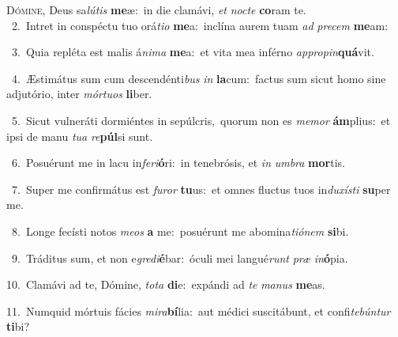 \lettrine{\initial\textcolor{\initialcolor}{D}}{ómine,} Deus sa\-\textit{lú}\-\textit{tis} \textbf{me}\-æ:~\star in die clamávi, \textit{et} \textit{noc}\-\textit{te} \textbf{co}\-ram te.\\
{\numbfont\textcolor{\numbcolor}{~2.}}~Intret in conspéctu tuo orá\-\textit{ti}\-\textit{o} \textbf{me}\-a:~\star inclína aurem tuam \textit{ad} \textit{pre}\-\textit{cem} \textbf{me}\-am:\par
{\numbfont\textcolor{\numbcolor}{~3.}}~Quia repléta est malis á\-\textit{ni}\-\textit{ma} \textbf{me}\-a:~\star et vita mea inférno \textit{ap}\-\textit{pro}\textit{pin}\textbf{quá}vit.\par
{\numbfont\textcolor{\numbcolor}{~4.}}~Æstimátus sum cum descendénti\textit{bus} \textit{in} \textbf{la}\-cum:~\star factus sum sicut homo sine adjutório, inter \textit{mór}\-\textit{tu}\textit{os} \textbf{li}\-ber.\par
{\numbfont\textcolor{\numbcolor}{~5.}}~Sicut vulneráti dormiéntes in sepúlcris,~\dagger quorum non es \textit{me}\-\textit{mor} \textbf{ám}\-plius:~\star et ipsi de manu \textit{tu}\-\textit{a} \textit{re}\-\textbf{púl}si sunt.\par
{\numbfont\textcolor{\numbcolor}{~6.}}~Posuérunt me in lacu in\-\textit{fe}\-\textit{ri}\textbf{ó}ri:~\star in tenebrósis, et \textit{in} \textit{um}\-\textit{bra} \textbf{mor}\-tis.\par
{\numbfont\textcolor{\numbcolor}{~7.}}~Super me confirmátus est \textit{fu}\-\textit{ror} \textbf{tu}\-us:~\star et omnes fluctus tuos in\-\textit{du}\-\textit{xís}\textit{ti} \textbf{su}\-per me.\par
{\numbfont\textcolor{\numbcolor}{~8.}}~Longe fecísti notos \textit{me}\-\textit{os} \textbf{a} me:~\star posuérunt me abomina\-\textit{ti}\-\textit{ó}\textit{nem} \textbf{si}\-bi.\par
{\numbfont\textcolor{\numbcolor}{~9.}}~Tráditus sum, et non e\-\textit{gre}\-\textit{di}\textbf{é}bar:~\star óculi mei langué\textit{runt} \textit{præ} \textit{in}\-\textbf{ó}pia.\par
{\numbfont\textcolor{\numbcolor}{10.}}~Clamávi ad te, Dómine, \textit{to}\-\textit{ta} \textbf{di}\-e:~\star expándi ad \textit{te} \textit{ma}\-\textit{nus} \textbf{me}\-as.\par
{\numbfont\textcolor{\numbcolor}{11.}}~Numquid mórtuis fácies \textit{mi}\-\textit{ra}\textbf{bí}lia:~\star aut médici suscitábunt, et confi\-\textit{te}\-\textit{bún}\textit{tur} \textbf{ti}\-bi?\par
